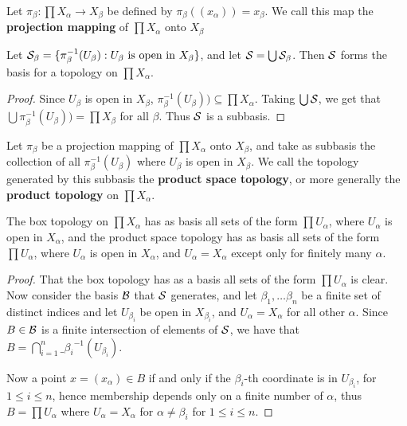 \begin{definition}
    Let $\pi_{\beta}:\prod{X_{\alpha}} \rightarrow X_{\beta}$ be defined by
    $\pi_{\beta}((x_\alpha))=x_\beta$. We call this map the \textbf{projection mapping} of
    $\prod{X_{\alpha}}$ onto $X_{\beta}$		
\end{definition}

\begin{theorem}\label{2.1.2}
    Let $\mathcal{S}_{\beta}=\{\pi^{-1}_{\beta}(U_{\beta}):U_{\beta} \text{ is open in } X_{\beta}\}$, and let
    $\mathcal{S}=\bigcup{\mathcal{S}_{\beta}}$. Then $\mathcal{S}$ forms the basis for a topology on  $\prod{X_{\alpha}}$.
\end{theorem}
\begin{proof}
    Since $U_{\beta}$ is open in $X_{\beta}$, $\pi^{-1}_{\beta}(U_{\beta})) \subseteq
    \prod{X_\alpha}$. Taking $\bigcup{\mathcal{S}}$, we get that $\bigcup{\pi^{-1}_{\beta}(U_{\beta}))} =
    \prod{X}_{\beta}$ for all $\beta$. Thus  $\mathcal{S}$ is a subbasis.
\end{proof}


\begin{definition}
    Let $\pi_{\beta}$ be a projection mapping of $\prod{X_{\alpha}}$ onto $X_{\beta}$, and take as
    subbasis the collection of all $\pi^{-1}_{\beta}(U_{\beta})$ where $U_{\beta}$ is open in
    $X_{\beta}$. We call the topology generated by this subbasis the \textbf{product space
    topology}, or more generally the \textbf{product topology} on $\prod{X_{\alpha}}$.		
\end{definition}

\begin{theorem}\label{2.1.3}
    The box topology on $\prod{X_{\alpha}}$ has as basis all sets of the form $\prod{U_{\alpha}}$,
    where $U_{\alpha}$ is open in $X_{\alpha}$, and the product space topology has as basis all sets
    of the form $\prod{U_{\alpha}}$, where $U_{\alpha}$ is open in $X_{\alpha}$, and
    $U_{\alpha}=X_{\alpha}$ except only for finitely many $\alpha$.
\end{theorem}
\begin{proof}
    That the box topology has as a basis all sets of the form  $\prod{U_{\alpha}}$ is clear. Now 
    consider the basis $\mathcal{B}$ that  $\mathcal{S}$ generates, and let  $\beta_1, \dots \beta_n$ be a finite
    set of distinct indices and let $U_{\beta_i}$ be open in $X_{\beta_i}$, and
    $U_{\alpha}=X_{\alpha}$ for all other $\alpha$. Since  $B \in \mathcal{B}$ is a finite intersection of
    elements of  $\mathcal{S}$, we have that  $B=\bigcap_{i = 1}^{n}{\_{\beta_i}^{-1}(U_{\beta_i})}$.

    Now a point $x=(x_{\alpha}) \in B$ if and only if the $\beta_i$-th coordinate is in
    $U_{\beta_i}$, for $1 \leq i \leq n$, hence membership depends only on a finite number of
    $\alpha$, thus  $B=\prod{U_{\alpha}}$ where $U_{\alpha}=X_{\alpha}$ for $\alpha \neq \beta_i$
    for  $1 \leq i \leq n$.
\end{proof}


